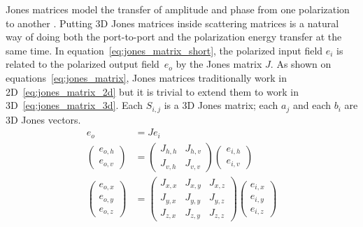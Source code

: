 \documentclass[a4paper,11pt]{article}
\begin{document}
Jones matrices model the transfer of amplitude and phase from one polarization to another \cite{hecht2002optics}.
Putting 3D Jones matrices inside scattering matrices is a natural way of doing both the port-to-port and the polarization energy transfer at the same time.
In equation~\eqref{eq:jones_matrix_short}, the polarized input field $e_i$ is related to the polarized output field~$e_o$ by the Jones matrix $J$.
As shown on equations~\eqref{eq:jones_matrix}, Jones matrices traditionally work in 2D~\eqref{eq:jones_matrix_2d} but it is trivial to extend them to work in 3D~\eqref{eq:jones_matrix_3d}.
Each $S_{i, j}$ is a 3D Jones matrix; each $a_j$ and each $b_i$ are 3D Jones vectors.
\begin{subequations}    
    \begin{align}
        e_o &= J e_i
        \label{eq:jones_matrix_short}
        \\
        \begin{pmatrix}
            e_{o, h}\\
            e_{o, v}
        \end{pmatrix}
        &=
        \begin{pmatrix}
            J_{h, h}   &   J_{h, v} \\
            J_{v, h}   &   J_{v, v}
        \end{pmatrix}
        \begin{pmatrix}
            e_{i, h}\\
            e_{i, v}
        \end{pmatrix}
        \label{eq:jones_matrix_2d}
        \\
        \begin{pmatrix}
            e_{o, x}\\
            e_{o, y}\\
            e_{o, z}
        \end{pmatrix}
        &=
        \begin{pmatrix}
            J_{x, x}   &   J_{x, y}   &   J_{x, z} \\
            J_{y, x}   &   J_{y, y}   &   J_{y, z} \\
            J_{z, x}   &   J_{z, y}   &   J_{z, z}
        \end{pmatrix}
        \begin{pmatrix}
            e_{i, x}\\
            e_{i, y}\\
            e_{i, z}
        \end{pmatrix}
        \label{eq:jones_matrix_3d}
    \end{align}
    \label{eq:jones_matrix}
\end{subequations}
\end{document}
